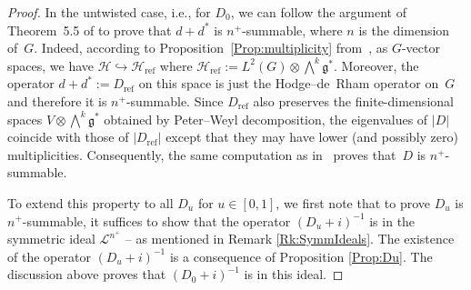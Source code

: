\documentclass[pdftex]{sigma}
\newcommand{\Hh}{\mathscr{H}}
\newcommand{\inj}{\hookrightarrow}
\newcommand{\LieG}{\mathfrak{g}}
\newcommand{\SymmIdeal}{\mathscr{L}}
\numberwithin{equation}{section}
\begin{document}
\begin{proof}
In the untwisted case, i.e., for $D_0$, we can follow the argument of Theorem~5.5 of \cite{TrSpLieGpGG} to prove that $d +d^*$ is $n^+$-summable, where $n$ is the dimension of~$G$. Indeed, according to Proposition~\ref{Prop:multiplicity} from~\cite{ErgodCpctGpHKLS}, as $G$-vector spaces, we have $\Hh \inj \Hh_\text{ref}$ where $\Hh_\text{ref} := L^2(G) \otimes \bigwedge^k \LieG^*$. Moreover, the operator $d +d^* := D_\text{ref}$ on this space is just the Hodge--de~Rham operator on~$G$ and therefore it is $n^+$-summable. Since $D_\text{ref}$ also preserves the f\/inite-dimensional spaces $V \otimes \bigwedge^k \LieG^*$ obtained by Peter--Weyl decomposition, the eigenvalues of $|D|$ coincide with those of $|D_\text{ref}|$ except that they may have lower (and possibly zero) multiplicities. Consequently, the same computation as in~\cite{TrSpLieGpGG} proves that~$D$ is $n^+$-summable.

To extend this property to all $D_u$ for $u \in [0,1]$, we f\/irst note that to prove $D_u$ is $n^+$-summable, it suf\/f\/ices to show that the operator $(D_u + i)^{-1}$ is in the symmetric ideal $\SymmIdeal^{n^+}$ -- as mentioned in Remark \ref{Rk:SymmIdeals}. The existence of the operator $(D_u + i)^{-1}$ is a consequence of Proposition \ref{Prop:Du}. The discussion above proves that $(D_0 + i)^{-1}$ is in this ideal.



\end{proof}
\end{document}
